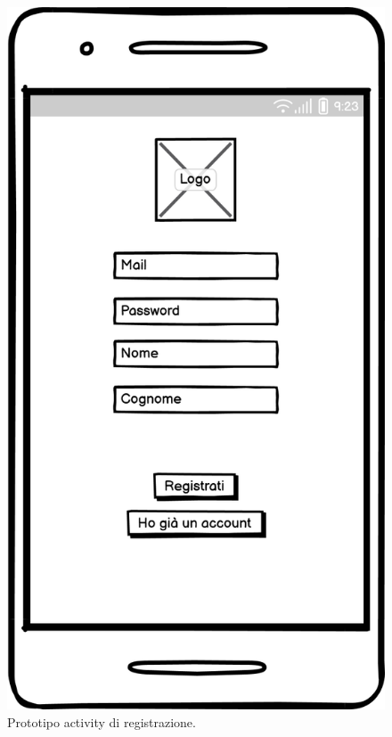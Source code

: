 \documentclass[a4paper,final,12pt]{report}
\begin{document}
\begin{figure}[hbtp]
\centering
\includegraphics[scale=0.30]{img_concettuale/RegistrazioneMobile.png}
\caption{Prototipo activity di registrazione.}
\label{figura:r}
\end{figure}
\end{document}
